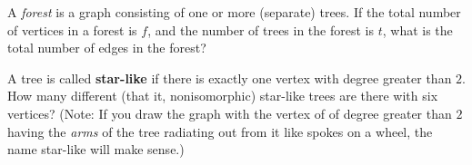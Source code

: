 \begin{prob}
A {\it forest} is a graph consisting of one or more (separate) trees. If the total number of vertices in a forest is $f$, and the number of trees in the forest is $t$, what is the total number of edges in the forest?
\end{prob}

\begin{prob}
A tree is called {\bf star{-}like} if there is exactly one vertex with degree greater than $2$. How many different (that it, nonisomorphic) star{-}like trees are there with six vertices? (Note: If you draw the graph with the vertex of of degree greater than $2$ having the {\it arms} of the tree radiating out from it like spokes on a wheel, the name star{-}like will make sense.)
\end{prob}

\vfill\break

